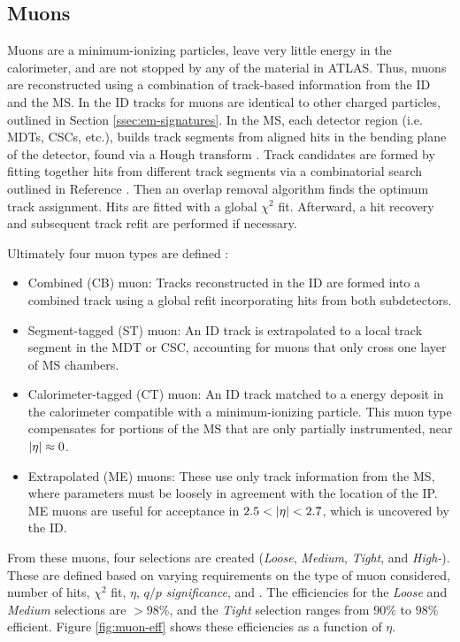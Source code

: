 \subsection{Muons} \label{ssec:muon-reco}

Muons are a minimum-ionizing particles, leave very little energy in the calorimeter, and are not stopped by any of the material in ATLAS. Thus, muons are reconstructed using a combination of track-based information from the \gls{ID} and the \gls{MS}. In the \gls{ID} tracks for muons are identical to other charged particles, outlined in Section \ref{ssec:em-signatures}. In the \gls{MS}, each detector region (i.e. \glspl{MDT}, \glspl{CSC}, etc.), builds track segments from aligned hits in the bending plane of the detector, found via a Hough transform \cite{hough-transf}. Track candidates are formed by fitting together hits from different track segments via a combinatorial search outlined in Reference \cite{muon-reco}. Then an overlap removal algorithm finds the optimum track assignment. Hits are fitted with a global $\chi^2$ fit. Afterward, a hit recovery and subsequent track refit are performed if necessary.

Ultimately four muon types are defined \cite{muon-reco}:
\begin{itemize}
    \item Combined (CB) muon: Tracks reconstructed in the \gls{ID} are formed into a combined track using a global refit incorporating hits from both subdetectors.
    \item Segment-tagged (ST) muon: An \gls{ID} track is extrapolated to a local track segment in the \gls{MDT} or \gls{CSC}, accounting for muons that only cross one layer of \gls{MS} chambers.
    \item Calorimeter-tagged (CT) muon: An \gls{ID} track matched to a energy deposit in the calorimeter compatible with a minimum-ionizing particle. This muon type compensates for portions of the \gls{MS} that are only partially instrumented, near $|\eta| \approx 0$.
    \item Extrapolated (ME) muons: These use only track information from the \gls{MS}, where parameters must be loosely in agreement with the location of the \gls{IP}. ME muons are useful for acceptance in $2.5 < |\eta| < 2.7$, which is uncovered by the \gls{ID}.
\end{itemize}


From these muons, four selections are created (\textit{Loose}, \textit{Medium}, \textit{Tight}, and \textit{High-\pt}). These are defined based on varying requirements on the type of muon considered, number of hits, $\chi^2$ fit, $\eta$, $q/p$ \textit{significance}, and \pt. The efficiencies for the \textit{Loose} and \textit{Medium} selections are $>98\%$, and the \textit{Tight} selection ranges from $90\%$ to $98\%$ efficient. Figure \ref{fig:muon-eff} shows these efficiencies as a function of $\eta$.


